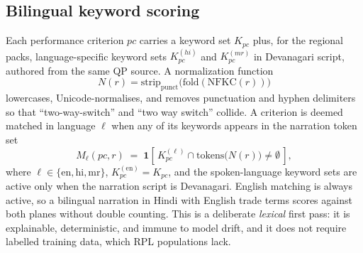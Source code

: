 \documentclass[conference]{IEEEtran}
\begin{document}
\subsection{Bilingual keyword scoring}
Each performance criterion $pc$ carries a keyword set $K_{pc}$ plus, for the regional
packs, language-specific keyword sets $K_{pc}^{(hi)}$ and $K_{pc}^{(mr)}$ in Devanagari
script, authored from the same QP source. A normalization function
\begin{equation}
N(r) = \mathrm{strip}_{\mathrm{punct}}\!\big(\mathrm{fold}(\mathrm{NFKC}(r))\big)
\label{eq:norm}
\end{equation}
lowercases, Unicode-normalises, and removes punctuation and hyphen delimiters so that
``two-way-switch'' and ``two way switch'' collide. A criterion is deemed matched in language
$\ell$ when any of its keywords appears in the narration token set
\begin{equation}
M_\ell(pc, r) \;=\;
\mathbf{1}\!\left[\, K_{pc}^{(\ell)} \cap \mathrm{tokens}\!\big(N(r)\big) \ne \emptyset
\,\right],
\label{eq:match}
\end{equation}
where $\ell \in \{\mathrm{en},\mathrm{hi},\mathrm{mr}\}$, $K_{pc}^{(\mathrm{en})}=K_{pc}$,
and the spoken-language keyword sets are active only when the narration script is Devanagari.
English matching is always active, so a bilingual narration in Hindi with English trade
terms scores against both planes without double counting. This is a deliberate
\emph{lexical} first pass: it is explainable, deterministic, and immune to model drift, and
it does not require labelled training data, which RPL populations lack.
\end{document}
